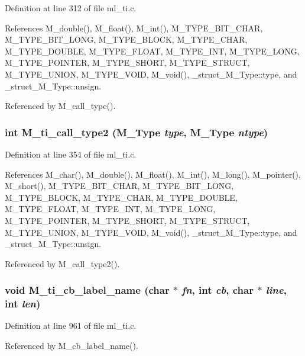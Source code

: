 Definition at line 312 of file ml\_\-ti.c.

References M\_\-double(), M\_\-float(), M\_\-int(), M\_\-TYPE\_\-BIT\_\-CHAR, M\_\-TYPE\_\-BIT\_\-LONG, M\_\-TYPE\_\-BLOCK, M\_\-TYPE\_\-CHAR, M\_\-TYPE\_\-DOUBLE, M\_\-TYPE\_\-FLOAT, M\_\-TYPE\_\-INT, M\_\-TYPE\_\-LONG, M\_\-TYPE\_\-POINTER, M\_\-TYPE\_\-SHORT, M\_\-TYPE\_\-STRUCT, M\_\-TYPE\_\-UNION, M\_\-TYPE\_\-VOID, M\_\-void(), \_\-struct\_\-M\_\-Type::type, and \_\-struct\_\-M\_\-Type::unsign.

Referenced by M\_\-call\_\-type().
\subsubsection{\setlength{\rightskip}{0pt plus 5cm}int M\_\-ti\_\-call\_\-type2 (\bf{M\_\-Type} {\em type}, \bf{M\_\-Type} {\em ntype})}\label{ml__ti_8c_8c6df6f3f3e5260cd76d9bb7cf952457}




Definition at line 354 of file ml\_\-ti.c.

References M\_\-char(), M\_\-double(), M\_\-float(), M\_\-int(), M\_\-long(), M\_\-pointer(), M\_\-short(), M\_\-TYPE\_\-BIT\_\-CHAR, M\_\-TYPE\_\-BIT\_\-LONG, M\_\-TYPE\_\-BLOCK, M\_\-TYPE\_\-CHAR, M\_\-TYPE\_\-DOUBLE, M\_\-TYPE\_\-FLOAT, M\_\-TYPE\_\-INT, M\_\-TYPE\_\-LONG, M\_\-TYPE\_\-POINTER, M\_\-TYPE\_\-SHORT, M\_\-TYPE\_\-STRUCT, M\_\-TYPE\_\-UNION, M\_\-TYPE\_\-VOID, M\_\-void(), \_\-struct\_\-M\_\-Type::type, and \_\-struct\_\-M\_\-Type::unsign.

Referenced by M\_\-call\_\-type2().
\subsubsection{\setlength{\rightskip}{0pt plus 5cm}void M\_\-ti\_\-cb\_\-label\_\-name (char $\ast$ {\em fn}, int {\em cb}, char $\ast$ {\em line}, int {\em len})}\label{ml__ti_8c_9be118e933c4eac229cc67eca1a60c6a}




Definition at line 961 of file ml\_\-ti.c.

Referenced by M\_\-cb\_\-label\_\-name().
